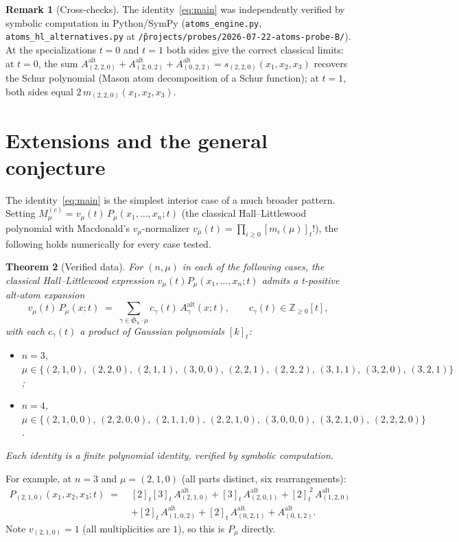 \documentclass[11pt]{article}
\newtheorem{theorem}{Theorem}
\theoremstyle{definition}
\newtheorem{remark}[theorem]{Remark}
\newcommand{\gauss}[1]{[#1]_t}
\newcommand{\gaussfact}[1]{\gauss{#1}!}
\newcommand{\Aalt}{A^{\mathrm{alt}}}
\newcommand{\Cmu}{M^{(c)}_{\mu}}
\newcommand{\ZZ}{\mathbb{Z}}
\begin{document}
\begin{remark}[Cross-checks]
The identity~\eqref{eq:main} was independently verified by symbolic computation in
Python/SymPy (\texttt{atoms\_engine.py}, \texttt{atoms\_hl\_alternatives.py} at
\texttt{\~/projects/probes/2026-07-22-atoms-probe-B/}). At the specializations $t=0$ and
$t=1$ both sides give the correct classical limits: at $t=0$, the sum
$\Aalt_{(2,2,0)}+\Aalt_{(2,0,2)}+\Aalt_{(0,2,2)} = s_{(2,2,0)}(x_1,x_2,x_3)$ recovers the
Schur polynomial (Mason atom decomposition of a Schur function); at $t=1$, both sides
equal $2\,m_{(2,2,0)}(x_1,x_2,x_3)$.
\end{remark}

\section{Extensions and the general conjecture}
\label{sec:conjecture}

The identity~\eqref{eq:main} is the simplest interior case of a much broader
pattern. Setting $\Cmu = v_\mu(t)\,P_\mu(x_1,\dots,x_n;t)$ (the classical
Hall--Littlewood polynomial with Macdonald's $v_\mu$-normalizer $v_\mu(t)=\prod_{i\ge 0}
\gaussfact{m_i(\mu)}$), the following holds numerically for every case tested.

\begin{theorem}[Verified data]
\label{thm:data}
For $(n,\mu)$ in each of the following cases, the classical Hall--Littlewood expression
$v_\mu(t)P_\mu(x_1,\dots,x_n;t)$ admits a t-positive alt-atom expansion
\[
   v_\mu(t)\,P_\mu(x;t) \;=\; \sum_{\gamma\in \mathfrak{S}_n\cdot \mu} c_\gamma(t)\,\Aalt_\gamma(x;t),
   \qquad c_\gamma(t)\in \ZZ_{\ge 0}[t],
\]
with each $c_\gamma(t)$ a product of Gaussian polynomials $\gauss{k}$:
\begin{itemize}
\item $n=3$, $\mu \in \{(2,1,0),\,(2,2,0),\,(2,1,1),\,(3,0,0),\,(2,2,1),\,(2,2,2),\,(3,1,1),\,(3,2,0),\,(3,2,1)\}$;
\item $n=4$, $\mu \in \{(2,1,0,0),\,(2,2,0,0),\,(2,1,1,0),\,(2,2,1,0),\,(3,0,0,0),\,(3,2,1,0),\,(2,2,2,0)\}$.
\end{itemize}
Each identity is a finite polynomial identity, verified by symbolic computation.
\end{theorem}

For example, at $n=3$ and $\mu=(2,1,0)$ (all parts distinct, six rearrangements):
\begin{align*}
   P_{(2,1,0)}(x_1,x_2,x_3;t) \;=\;{}& \gauss{2}\gauss{3}\,\Aalt_{(2,1,0)}
                             + \gauss{3}\,\Aalt_{(2,0,1)}
                             + \gauss{2}^{\,2}\,\Aalt_{(1,2,0)} \\
   & + \gauss{2}\,\Aalt_{(1,0,2)}
     + \gauss{2}\,\Aalt_{(0,2,1)}
     + \Aalt_{(0,1,2)}.
\end{align*}
Note $v_{(2,1,0)}=1$ (all multiplicities are $1$), so this is $P_\mu$ directly.
\end{document}
